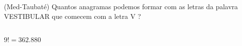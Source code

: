 \begin{ex}
(Med-Taubaté) Quantos anagramas podemos formar com as letras da palavra VESTIBULAR que comecem com a letra V ?
 \begin{sol}
  \phantom{A} \\
  $9!=362.880$
 \end{sol}
\end{ex}